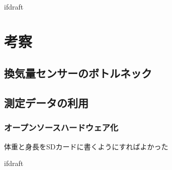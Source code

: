 \expandafter\ifx\csname ifdraft\endcsname\relax
 
\fi

\section{考察}

\subsection{換気量センサーのボトルネック}

\subsection{測定データの利用}

\subsubsection{オープンソースハードウェア化}

体重と身長をSDカードに書くようにすればよかった

\expandafter\ifx\csname ifdraft\endcsname\relax
  
\fi
